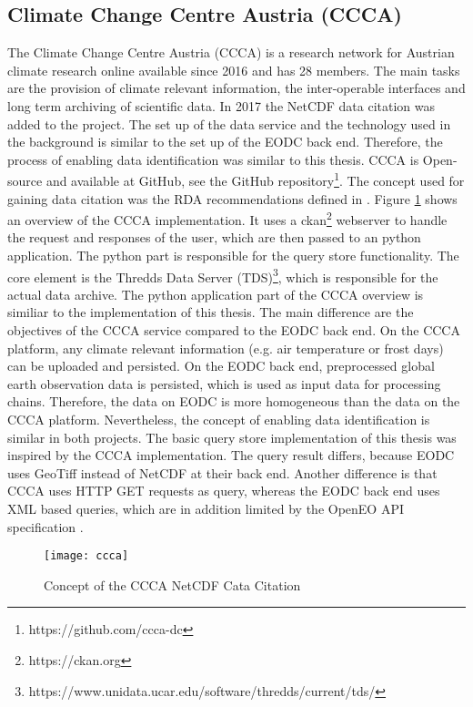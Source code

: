\documentclass[draft,final]{vutinfth} %
\begin{document}
\subsection{Climate Change Centre Austria (CCCA)}

The Climate Change Centre Austria (CCCA) is a research network for Austrian climate research online available since 2016 and has 28 members. The main tasks are the provision of climate relevant information, the inter-operable interfaces and long term archiving of scientific data. In 2017 the NetCDF data citation was added to the project. The set up of the data service and the technology used in the background is similar to the set up of the EODC back end. Therefore, the process of enabling data identification was similar to this thesis. CCCA is Open-source and available at GitHub, see the GitHub repository\footnote{https://github.com/ccca-dc}. The concept used for gaining data citation was the RDA recommendations defined in \cite{rauber2016identification}. Figure \ref{fig:ccca} shows an overview of the CCCA implementation. It uses a ckan\footnote{https://ckan.org} webserver to handle the request and responses of the user, which are then passed to an python application. The python part is responsible for the query store functionality. The core element is the Thredds Data Server (TDS)\footnote{https://www.unidata.ucar.edu/software/thredds/current/tds/}, which is responsible for the actual data archive.   
The python application part of the CCCA overview is similiar to the implementation of this thesis. The main difference are the objectives of the CCCA service compared to the EODC back end. On the CCCA platform, any climate relevant information (e.g. air temperature or frost days) can be uploaded and persisted. On the EODC back end, preprocessed global earth observation data is persisted, which is used as input data for processing chains. Therefore, the data on EODC is more homogeneous than the data on the CCCA platform. Nevertheless, the concept of enabling data identification is similar in both projects. The basic query store implementation of this thesis was inspired by the CCCA implementation. The query result differs, because EODC uses GeoTiff instead of NetCDF at their back end. Another difference is that CCCA uses HTTP GET requests as query, whereas the EODC back end uses XML based queries, which are in addition limited by the OpenEO API specification  \cite{ccca}.  

\begin{figure}[h]
	\centering
	\texttt{[image: ccca]}
	\caption{Concept of the CCCA NetCDF Cata Citation}
	\label{fig:ccca} %
\end{figure}
\end{document}
